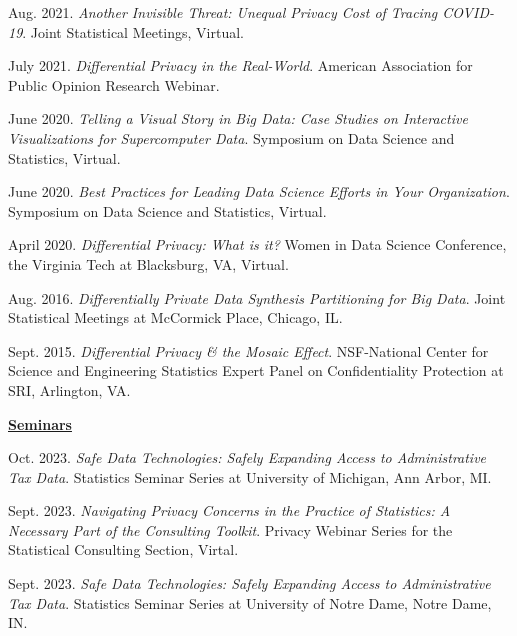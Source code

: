 \begin{etaremune}[topsep=0pt, itemsep=4pt, partopsep=0pt, parsep=0pt]
    \item Aug. 2021. \textit{Another Invisible Threat: Unequal Privacy Cost of Tracing COVID-19}. Joint Statistical Meetings, Virtual.
    
    \item July 2021. \textit{Differential Privacy in the Real-World}. American Association for Public Opinion Research Webinar.

    \item June 2020. \textit{Telling a Visual Story in Big Data: Case Studies on Interactive Visualizations for Supercomputer Data}. Symposium on Data Science and Statistics, Virtual.
  
    \item June 2020. \textit{Best Practices for Leading Data Science Efforts in Your Organization}. Symposium on Data Science and Statistics, Virtual.
  
    \item April 2020. \textit{Differential Privacy: What is it?} Women in Data Science Conference, the Virginia Tech at Blacksburg, VA, Virtual.

    \item Aug. 2016. \textit{Differentially Private Data Synthesis Partitioning for Big Data}. Joint Statistical Meetings at McCormick Place, Chicago, IL.
    
    \item Sept. 2015. \textit{Differential Privacy \& the Mosaic Effect}. NSF-National Center for Science and Engineering Statistics Expert Panel on Confidentiality Protection at SRI, Arlington, VA.

\vspace{6pt}
\hspace{-0.30in}\underline{\textbf{\large Seminars}}\normalsize
    \item Oct. 2023. \textit{Safe Data Technologies: Safely Expanding Access to Administrative Tax Data}. Statistics Seminar Series at University of Michigan, Ann Arbor, MI.

    \item Sept. 2023. \textit{Navigating Privacy Concerns in the Practice of Statistics: A Necessary Part of the Consulting Toolkit}. Privacy Webinar Series for the Statistical Consulting Section, Virtal.    
    
    \item Sept. 2023. \textit{Safe Data Technologies: Safely Expanding Access to Administrative Tax Data}. Statistics Seminar Series at University of Notre Dame, Notre Dame, IN.
    

\end{etaremune}

